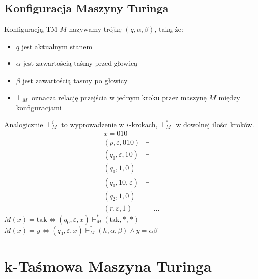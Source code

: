 \documentclass{article}
\numberwithin{equation}{subsection}
\begin{document}
\subsection{Konfiguracja Maszyny Turinga}

Konfiguracją TM $M$ nazywamy trójkę $(q,\alpha, \beta)$, taką że:
\begin{itemize}
    \item $q$ jest aktualnym stanem
    \item $\alpha$ jest zawartością taśmy przed głowicą
    \item $\beta$ jest zawartością tasmy po głowicy
    \item $\vdash_M$ oznacza relację przejścia w jednym kroku przez maszynę $M$ między konfiguracjami
\end{itemize}
Analogicznie $\vdash_M^i$ to wyprowadzenie w $i$-krokach, $\vdash_M^{*}$ w dowolnej ilości kroków.
\begin{align*}
    x = 010& \\
    (p,\varepsilon, 010) &\vdash \\
    (q_0, \varepsilon, 10) &\vdash \\
    (q_0, 1, 0) &\vdash \\
    (q_0, 10, \varepsilon) &\vdash \\
    (q_2, 1, 0) &\vdash \\
    (r, \varepsilon, 1) &\vdash \dots
\end{align*}
$M(x) = \text{tak} \iff (q_0,\varepsilon, x) \vdash_M^{*} (\text{tak}, *, *)$\\
$M(x) = y \iff (q_0, \varepsilon, x) \vdash_M^{*} (h, \alpha, \beta) \land y=\alpha\beta$

\section{k-Taśmowa Maszyna Turinga}
\end{document}
